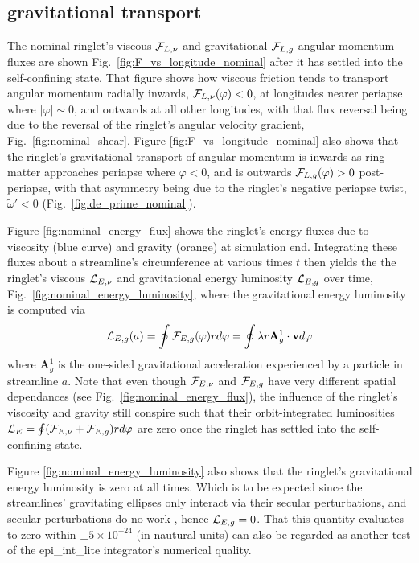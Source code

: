 \documentclass[preprint]{aastex62}
\begin{document}
\subsection{gravitational transport}
\label{subsec:gravitational_flux}

The nominal ringlet's viscous ${\cal F}_{L,\nu}$ and gravitational ${\cal F}_{L,g}$
angular momentum fluxes are shown Fig.\ \ref{fig:F_vs_longitude_nominal} after it has settled into the self-confining state. 
That figure shows how viscous friction tends to transport angular momentum radially inwards, ${\cal F}_{L,\nu}(\varphi)<0$, 
at longitudes nearer periapse where $|\varphi|\sim0$, and outwards
at all other longitudes, with that flux reversal being due to the
reversal of the ringlet's angular velocity gradient, Fig.\ \ref{fig:nominal_shear}. 
Figure \ref{fig:F_vs_longitude_nominal} also shows that the ringlet's gravitational
transport of angular momentum is inwards as
ring-matter approaches periapse where $\varphi<0$, 
and is outwards ${\cal F}_{L,g}(\varphi)>0$ post-periapse, with that asymmetry being due to the ringlet's
negative periapse twist, $\tilde{\omega}'<0$ (Fig.\ \ref{fig:de_prime_nominal}).

Figure \ref{fig:nominal_energy_flux} shows the ringlet's energy fluxes 
due to viscosity (blue curve) and gravity (orange) at simulation end.
Integrating these fluxes about a streamline's circumference at various times $t$ then yields the
the ringlet's viscous ${\cal L}_{E,\nu}$ and gravitational energy luminosity ${\cal L}_{E,g}$ over time,
Fig.\ \ref{fig:nominal_energy_luminosity}, where the gravitational energy luminosity is computed via
\begin{equation}
    \label{eqn:L_g}
    {\cal L}_{E,g}(a) = \oint {\cal F}_{E,g}(\varphi)rd\varphi = \oint \lambda r\mathbf{A}^1_g\cdot\mathbf{v}d\varphi
\end{equation}
where $\mathbf{A}^1_g$ is the one-sided gravitational acceleration experienced by a particle in streamline $a$.
Note that even though ${\cal F}_{E,\nu}$ and ${\cal F}_{E,g}$ have very different spatial dependances 
(see Fig.\ \ref{fig:nominal_energy_flux}),
the influence of the ringlet's viscosity and gravity still conspire such that their
orbit-integrated luminosities ${\cal L}_{E}=\oint ({\cal F}_{E,\nu}+{\cal F}_{E,g})rd\varphi$ are zero 
once the ringlet has settled into the self-confining state.

Figure \ref{fig:nominal_energy_luminosity} also shows that 
the ringlet's gravitational energy luminosity is zero at all times. Which is to be expected since 
the streamlines' gravitating ellipses only interact via their secular
perturbations, and secular perturbations do no work \citep{BC61}, hence ${\cal L}_{E,g}=0$.
That this quantity evaluates to zero within $\pm5\times10^{-24}$ (in nautural units) can also be regarded
as another test of the epi\_int\_lite integrator's numerical quality.
\end{document}
